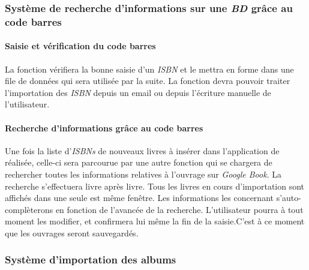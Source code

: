 \subsubsection{Système de recherche d'informations sur une \emph{BD} grâce au code barres}

\paragraph{Saisie et vérification du code barres}
La fonction vérifiera la bonne saisie d'un \emph{ISBN} et le mettra en forme dans une file de données qui sera utilisée par la suite. 
La fonction devra pouvoir traiter l'importation des \emph{ISBN} depuis un email ou depuis l'écriture manuelle de l'utilisateur. 

\paragraph{Recherche d'informations grâce au code barres}
Une fois la liste d'\emph{ISBNs} de nouveaux livres à insérer dans l'application de réalisée, 
	 celle-ci sera parcourue par une autre fonction qui se chargera de rechercher toutes les informations relatives à l'ouvrage sur \emph{Google Book}. 
La recherche s'effectuera livre après livre. 
Tous les livres en cours d'importation sont affichés dans une seule est même fenêtre. 
Les informations les concernant s'auto-complèterons en fonction de l'avancée de la recherche.
L'utilisateur pourra à tout moment les modifier, et confirmera lui même la fin de la saisie.C'est à ce moment que les ouvrages seront sauvegardés.

\subsubsection{Système d'importation des albums}

